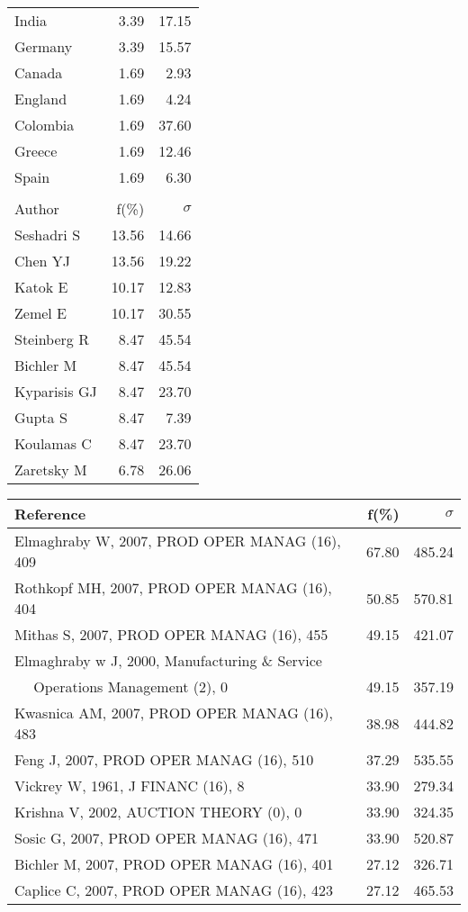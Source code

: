 \documentclass[a4paper,11pt]{report}
\begin{document}
\begin{landscape}
\begin{table}[!ht]
{\begin{tabular}{|l r r|}
India & 3.39 & 17.15\\
Germany & 3.39 & 15.57\\
Canada & 1.69 & 2.93\\
England & 1.69 & 4.24\\
Colombia & 1.69 & 37.60\\
Greece & 1.69 & 12.46\\
Spain & 1.69 & 6.30\\
 &  & \\
\hline
\hline
Author & f(\%) & $\sigma$\\
\hline
Seshadri S & 13.56 & 14.66\\
Chen YJ & 13.56 & 19.22\\
Katok E & 10.17 & 12.83\\
Zemel E & 10.17 & 30.55\\
Steinberg R & 8.47 & 45.54\\
Bichler M & 8.47 & 45.54\\
Kyparisis GJ & 8.47 & 23.70\\
Gupta S & 8.47 & 7.39\\
Koulamas C & 8.47 & 23.70\\
Zaretsky M & 6.78 & 26.06\\
\hline
\end{tabular}
}
{\scriptsize\begin{tabular}{|l r r|}
\hline
Reference & f(\%) & $\sigma$\\
\hline
Elmaghraby W, 2007, PROD OPER MANAG (16), 409 & 67.80 & 485.24\\
Rothkopf MH, 2007, PROD OPER MANAG (16), 404 & 50.85 & 570.81\\
Mithas S, 2007, PROD OPER MANAG (16), 455 & 49.15 & 421.07\\
Elmaghraby w J, 2000, Manufacturing \& Service &  & \\
$\quad$ Operations Management (2), 0 & 49.15 & 357.19\\
Kwasnica AM, 2007, PROD OPER MANAG (16), 483 & 38.98 & 444.82\\
Feng J, 2007, PROD OPER MANAG (16), 510 & 37.29 & 535.55\\
Vickrey W, 1961, J FINANC (16), 8 & 33.90 & 279.34\\
Krishna V, 2002, AUCTION THEORY (0), 0 & 33.90 & 324.35\\
Sosic G, 2007, PROD OPER MANAG (16), 471 & 33.90 & 520.87\\
Bichler M, 2007, PROD OPER MANAG (16), 401 & 27.12 & 326.71\\
Caplice C, 2007, PROD OPER MANAG (16), 423 & 27.12 & 465.53\\

\end{tabular}}
\end{table}
\end{landscape}
\end{document}
